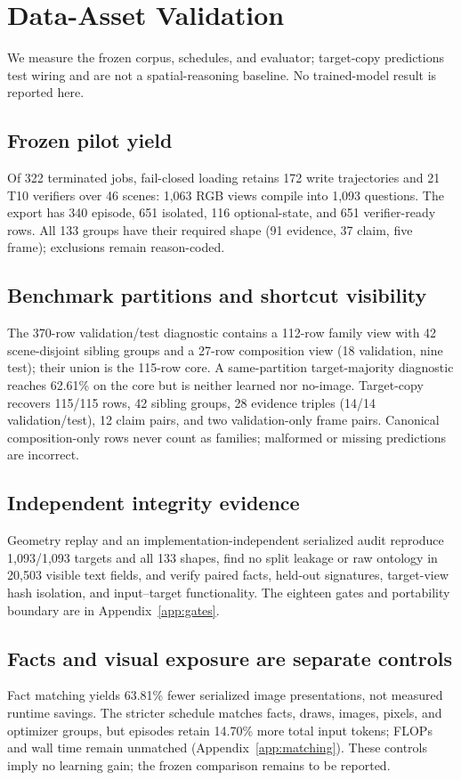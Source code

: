 \section{Data-Asset Validation}
\label{sec:experiments}

We measure the frozen corpus, schedules, and evaluator; target-copy predictions
test wiring and are not a spatial-reasoning baseline.  No trained-model result
is reported here.

\subsection{Frozen pilot yield}

Of 322 terminated jobs, fail-closed loading retains 172 write trajectories and
21 T10 verifiers over 46 scenes: 1,063 RGB views compile into 1,093 questions.
The export has 340 episode, 651 isolated, 116 optional-state, and 651
verifier-ready rows.  All 133 groups have their required shape (91 evidence,
37 claim, five frame); exclusions remain reason-coded.

\subsection{Benchmark partitions and shortcut visibility}

The 370-row validation/test diagnostic contains a 112-row family view with 42
scene-disjoint sibling groups and a 27-row composition view (18 validation,
nine test); their union is the 115-row core.  A same-partition target-majority
diagnostic reaches 62.61\% on the core but is neither learned nor no-image.
Target-copy recovers 115/115 rows, 42 sibling groups, 28 evidence triples
(14/14 validation/test), 12 claim pairs, and two validation-only frame pairs.
Canonical composition-only rows never count as families; malformed or missing
predictions are incorrect.

\subsection{Independent integrity evidence}

Geometry replay and an implementation-independent serialized audit reproduce
1,093/1,093 targets and all 133 shapes, find no split leakage or raw ontology in
20,503 visible text fields, and verify paired facts, held-out signatures,
target-view hash isolation, and input--target functionality.  The eighteen
gates and portability boundary are in Appendix~\ref{app:gates}.

\subsection{Facts and visual exposure are separate controls}

Fact matching yields 63.81\% fewer serialized image presentations, not measured
runtime savings.  The stricter schedule matches facts, draws, images, pixels,
and optimizer groups, but episodes retain 14.70\% more total input tokens;
FLOPs and wall time remain unmatched (Appendix~\ref{app:matching}).  These
controls imply no learning gain; the frozen comparison remains to be reported.
